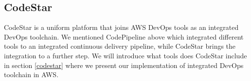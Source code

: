 \subsection{CodeStar}
CodeStar is a uniform platform that joins AWS DevOps tools as an integrated DevOps toolchain. We mentioned CodePipeline above which integrated different tools to an integrated continuous delivery pipeline, while CodeStar brings the integration to a further step.
We will introduce what tools does CodeStar include in section \ref{codestar} where we present our implementation of integrated DevOps toolchain in AWS.